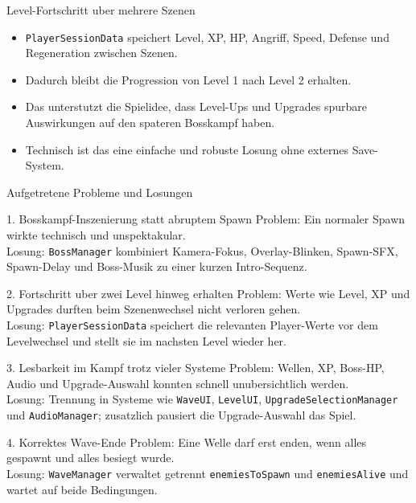 \documentclass[aspectratio=169]{beamer}
\begin{document}
\begin{frame}{Level-Fortschritt uber mehrere Szenen}
  \begin{itemize}
    \item \texttt{PlayerSessionData} speichert Level, XP, HP, Angriff, Speed, Defense und Regeneration zwischen Szenen.
    \item Dadurch bleibt die Progression von Level 1 nach Level 2 erhalten.
    \item Das unterstutzt die Spielidee, dass Level-Ups und Upgrades spurbare Auswirkungen auf den spateren Bosskampf haben.
    \item Technisch ist das eine einfache und robuste Losung ohne externes Save-System.
  \end{itemize}
\end{frame}



\begin{frame}[shrink=10]{Aufgetretene Probleme und Losungen}
  \small
  \begin{block}{1. Bosskampf-Inszenierung statt abruptem Spawn}
    Problem: Ein normaler Spawn wirkte technisch und unspektakular.\\
    Losung: \texttt{BossManager} kombiniert Kamera-Fokus, Overlay-Blinken, Spawn-SFX, Spawn-Delay und Boss-Musik zu einer kurzen Intro-Sequenz.
  \end{block}

  \begin{block}{2. Fortschritt uber zwei Level hinweg erhalten}
    Problem: Werte wie Level, XP und Upgrades durften beim Szenenwechsel nicht verloren gehen.\\
    Losung: \texttt{PlayerSessionData} speichert die relevanten Player-Werte vor dem Levelwechsel und stellt sie im nachsten Level wieder her.
  \end{block}

  \begin{block}{3. Lesbarkeit im Kampf trotz vieler Systeme}
    Problem: Wellen, XP, Boss-HP, Audio und Upgrade-Auswahl konnten schnell unubersichtlich werden.\\
    Losung: Trennung in Systeme wie \texttt{WaveUI}, \texttt{LevelUI}, \texttt{UpgradeSelectionManager} und \texttt{AudioManager}; zusatzlich pausiert die Upgrade-Auswahl das Spiel.
  \end{block}

  \begin{block}{4. Korrektes Wave-Ende}
    Problem: Eine Welle darf erst enden, wenn alles gespawnt und alles besiegt wurde.\\
    Losung: \texttt{WaveManager} verwaltet getrennt \texttt{enemiesToSpawn} und \texttt{enemiesAlive} und wartet auf beide Bedingungen.
  \end{block}
\end{frame}
\end{document}
